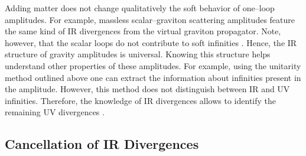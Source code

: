 \documentclass[11pt,a4paper]{article}
\begin{document}
Adding matter does not change qualitatively the soft behavior of one--loop amplitudes. For example, massless scalar--graviton scattering amplitudes feature the same kind of IR divergences from the virtual graviton propagator. Note, however, that the scalar loops do not contribute to soft infinities \cite{Grisaru:1979re}. Hence, the IR structure of gravity amplitudes is universal. Knowing this structure helps understand other properties of these amplitudes. For example, using the unitarity method outlined above one can extract the information about infinities present in the amplitude. However, this method does not distinguish between IR and UV infinities. Therefore, the knowledge of IR divergences allows to identify the remaining UV divergences \cite{Dunbar:1995ed}.

\subsection{Cancellation of IR Divergences}
\end{document}
